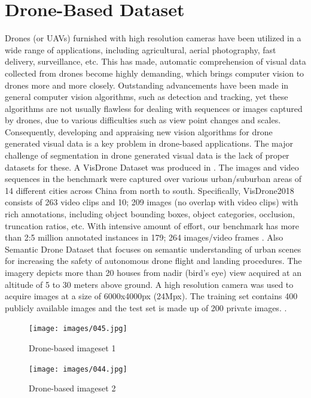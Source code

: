 \section{Drone-Based Dataset }
Drones (or UAVs) furnished with high resolution cameras have been utilized in a wide range of applications, 
including agricultural, aerial photography, fast delivery, surveillance, etc. This has made, automatic comprehension of 
visual data collected from drones become highly demanding, which brings computer vision to drones more and more closely.
 Outstanding advancements have been made in general computer vision algorithms, such as detection and tracking, yet these algorithms 
 are not usually flawless for dealing with sequences or images captured by drones, due to various difficulties such as view point changes 
 and scales. Consequently, developing and appraising new vision algorithms for drone generated visual data is a key problem in drone-based 
 applications.
The major challenge of segmentation in drone generated visual data is the lack of proper datasets for these. 
A VisDrone Dataset was produced in \cite{V}. The images and video sequences in the benchmark were captured over
 various urban/suburban areas of 14 different cities across China from north to south. Specifically, VisDrone2018 
 consists of 263 video clips and 10; 209 images (no overlap with video clips) with rich annotations, including object 
 bounding boxes, object categories, occlusion, truncation ratios, etc. With intensive amount of effort, our benchmark 
  has more than 2:5 million annotated instances in 179; 264 images/video frames \cite{V}. Also Semantic Drone Dataset that focuses on
   semantic understanding of urban scenes for increasing the safety of autonomous drone flight and landing procedures. The imagery depicts 
   more than 20 houses from nadir (bird's eye) view acquired at an altitude of 5 to 30 meters above ground. A high resolution camera was 
   used to acquire images at a size of 6000x4000px (24Mpx). The training set contains 400 publicly available images and the test set is 
    made up of 200 private images. \cite{W}.

\begin{figure}[H]
  \centering
  
    \texttt{[image: images/045.jpg]}
    \caption{Drone-based imageset 1}
    \label{image 1}
  \end{figure}
  
  \begin{figure}[H]
    \centering
    \texttt{[image: images/044.jpg]}
    \caption{Drone-based imageset 2}
    \label{image 2}
\end{figure}